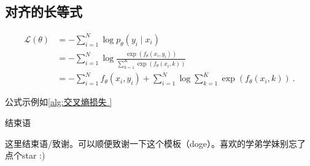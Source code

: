 	\subsection{对齐的长等式}
		
		\begin{align}
			\label{alg:交叉熵损失 }
			\mathcal{L}(\theta)
								&= - \sum_{i=1}^{N} \log p_\theta(y_i \mid x_i)  \nonumber\\
								&= - \sum_{i=1}^{N} \log   \frac{\exp(f_\theta(x_i, y_i))}
											{\sum_{k=1}^{K} \exp(f_\theta(x_i, k))}  \nonumber  \\
								&= - \sum_{i=1}^{N} f_\theta(x_i, y_i)
											+ \sum_{i=1}^{N} \log \sum_{k=1}^{K}
											\exp(f_\theta(x_i, k)) \ .
		\end{align}

	公式示例如\cref{alg:交叉熵损失 }

\newpage

\phantom{ 空一行}
\vspace{-2em}  %
\begin{center}
	\heiti
	结束语
\end{center}

这里结束语/致谢。可以顺便致谢一下这个模板（doge）。喜欢的学弟学妹别忘了
点个star :)